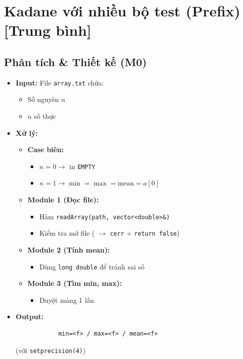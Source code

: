 \section{Kadane với nhiều bộ test (Prefix) [Trung bình]}
\subsection{Phân tích \& Thiết kế (M0)}
    \begin{itemize}
    \item \textbf{Input:}
    File \texttt{array.txt} chứa:
    \begin{itemize}
        \item Số nguyên $n$
        \item $n$ số thực
    \end{itemize}

    \item \textbf{Xử lý:}
        \begin{itemize}
            \item \textbf{Case biên:}
            \begin{itemize}
                \item $n = 0 \rightarrow$ in \texttt{EMPTY}
                \item $n = 1 \rightarrow \min = \max = \text{mean} = a[0]$
            \end{itemize}
            
            \item \textbf{Module 1 (Đọc file):}
            \begin{itemize}
                \item Hàm \texttt{readArray(path, vector<double>\&)}
                \item Kiểm tra mở file ( $\rightarrow$ \texttt{cerr} + \texttt{return false})
            \end{itemize}
            
            \item \textbf{Module 2 (Tính mean):}
            \begin{itemize}
                \item Dùng \texttt{long double} để tránh sai số
            \end{itemize}
            
            \item \textbf{Module 3 (Tìm min, max):}
            \begin{itemize}
                \item Duyệt mảng 1 lần
            \end{itemize}
        \end{itemize}

        \item \textbf{Output:}
        \begin{lstlisting}
            min=<f> / max=<f> / mean=<f>\end{lstlisting} 
        (với \texttt{setprecision(4)})
    \end{itemize}

